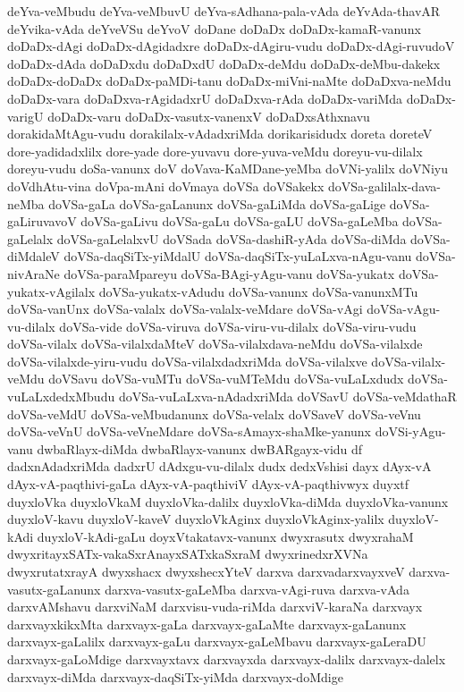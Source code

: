 {deYva-veMbudu
deYva-veMbuvU
deYva-sAdhana-pala-vAda
deYvAda-thavAR
deYvika-vAda
deYveVSu
deYvoV
doDane
doDaDx
doDaDx-kamaR-vanunx
doDaDx-dAgi
doDaDx-dAgidadxre
doDaDx-dAgiru-vudu
doDaDx-dAgi-ruvudoV
doDaDx-dAda
doDaDxdu
doDaDxdU
doDaDx-deMdu
doDaDx-deMbu-dakekx
doDaDx-doDaDx
doDaDx-paMDi-tanu
doDaDx-miVni-naMte
doDaDxva-neMdu
doDaDx-vara
doDaDxva-rAgidadxrU
doDaDxva-rAda
doDaDx-variMda
doDaDx-varigU
doDaDx-varu
doDaDx-vasutx-vanenxV
doDaDxsAthxnavu
dorakidaMtAgu-vudu
dorakilalx-vAdadxriMda
dorikarisidudx
doreta
doreteV
dore-yadidadxlilx
dore-yade
dore-yuvavu
dore-yuva-veMdu
doreyu-vu-dilalx
doreyu-vudu
doSa-vanunx
doV
doVava-KaMDane-yeMba
doVNi-yalilx
doVNiyu
doVdhAtu-vina
doVpa-mAni
doVmaya
doVSa
doVSakekx
doVSa-galilalx-dava-neMba
doVSa-gaLa
doVSa-gaLanunx
doVSa-gaLiMda
doVSa-gaLige
doVSa-gaLiruvavoV
doVSa-gaLivu
doVSa-gaLu
doVSa-gaLU
doVSa-gaLeMba
doVSa-gaLelalx
doVSa-gaLelalxvU
doVSada
doVSa-dashiR-yAda
doVSa-diMda
doVSa-diMdaleV
doVSa-daqSiTx-yiMdalU
doVSa-daqSiTx-yuLaLxva-nAgu-vanu
doVSa-nivAraNe
doVSa-paraMpareyu
doVSa-BAgi-yAgu-vanu
doVSa-yukatx
doVSa-yukatx-vAgilalx
doVSa-yukatx-vAdudu
doVSa-vanunx
doVSa-vanunxMTu
doVSa-vanUnx
doVSa-valalx
doVSa-valalx-veMdare
doVSa-vAgi
doVSa-vAgu-vu-dilalx
doVSa-vide
doVSa-viruva
doVSa-viru-vu-dilalx
doVSa-viru-vudu
doVSa-vilalx
doVSa-vilalxdaMteV
doVSa-vilalxdava-neMdu
doVSa-vilalxde
doVSa-vilalxde-yiru-vudu
doVSa-vilalxdadxriMda
doVSa-vilalxve
doVSa-vilalx-veMdu
doVSavu
doVSa-vuMTu
doVSa-vuMTeMdu
doVSa-vuLaLxdudx
doVSa-vuLaLxdedxMbudu
doVSa-vuLaLxva-nAdadxriMda
doVSavU
doVSa-veMdathaR
doVSa-veMdU
doVSa-veMbudanunx
doVSa-velalx
doVSaveV
doVSa-veVnu
doVSa-veVnU
doVSa-veVneMdare
doVSa-sAmayx-shaMke-yanunx
doVSi-yAgu-vanu
dwbaRlayx-diMda
dwbaRlayx-vanunx
dwBARgayx-vidu
df
dadxnAdadxriMda
dadxrU
dAdxgu-vu-dilalx
dudx
dedxVshisi
dayx
dAyx-vA
dAyx-vA-paqthivi-gaLa
dAyx-vA-paqthiviV
dAyx-vA-paqthivwyx
duyxtf
duyxloVka
duyxloVkaM
duyxloVka-dalilx
duyxloVka-diMda
duyxloVka-vanunx
duyxloV-kavu
duyxloV-kaveV
duyxloVkAginx
duyxloVkAginx-yalilx
duyxloV-kAdi
duyxloV-kAdi-gaLu
doyxVtakatavx-vanunx
dwyxrasutx
dwyxrahaM
dwyxritayxSATx-vakaSxrAnayxSATxkaSxraM
dwyxrinedxrXVNa
dwyxrutatxrayA
dwyxshacx
dwyxshecxYteV
darxva
darxvadarxvayxveV
darxva-vasutx-gaLanunx
darxva-vasutx-gaLeMba
darxva-vAgi-ruva
darxva-vAda
darxvAMshavu
darxviNaM
darxvisu-vuda-riMda
darxviV-karaNa
darxvayx
darxvayxkikxMta
darxvayx-gaLa
darxvayx-gaLaMte
darxvayx-gaLanunx
darxvayx-gaLalilx
darxvayx-gaLu
darxvayx-gaLeMbavu
darxvayx-gaLeraDU
darxvayx-gaLoMdige
darxvayxtavx
darxvayxda
darxvayx-dalilx
darxvayx-dalelx
darxvayx-diMda
darxvayx-daqSiTx-yiMda
darxvayx-doMdige
}
